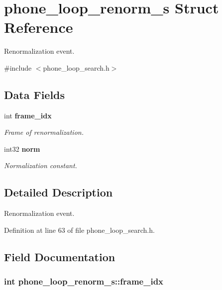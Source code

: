 \section{phone\+\_\+loop\+\_\+renorm\+\_\+s Struct Reference}
\label{structphone__loop__renorm__s}


Renormalization event.  




{\ttfamily \#include $<$phone\+\_\+loop\+\_\+search.\+h$>$}

\subsection*{Data Fields}
\begin{DoxyCompactItemize}
\item 
int {\bf frame\+\_\+idx}
\begin{DoxyCompactList}\small\item\em Frame of renormalization. \end{DoxyCompactList}\item 
int32 {\bf norm}
\begin{DoxyCompactList}\small\item\em Normalization constant. \end{DoxyCompactList}\end{DoxyCompactItemize}


\subsection{Detailed Description}
Renormalization event. 

Definition at line 63 of file phone\+\_\+loop\+\_\+search.\+h.



\subsection{Field Documentation}
\subsubsection[{frame\+\_\+idx}]{\setlength{\rightskip}{0pt plus 5cm}int phone\+\_\+loop\+\_\+renorm\+\_\+s\+::frame\+\_\+idx}\label{structphone__loop__renorm__s_af54c31c6d417b769b088b898294a135e}


